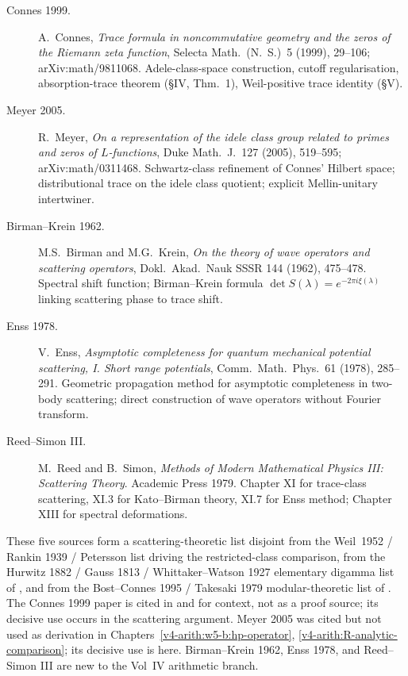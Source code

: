\begin{description}
\item[Connes 1999.] A.~Connes, \emph{Trace formula in noncommutative
geometry and the zeros of the Riemann zeta function}, Selecta
Math.~(N.~S.)~5 (1999), 29--106; arXiv:math/9811068. Adele-class-space
construction, cutoff regularisation, absorption-trace theorem
(\S IV, Thm.~1), Weil-positive trace identity (\S V).
\item[Meyer 2005.] R.~Meyer, \emph{On a representation of the idele
class group related to primes and zeros of \(L\)-functions}, Duke
Math.~J.~127 (2005), 519--595; arXiv:math/0311468. Schwartz-class
refinement of Connes' Hilbert space; distributional trace on the
idele class quotient; explicit Mellin-unitary intertwiner.
\item[Birman--Krein 1962.] M.S.~Birman and M.G.~Krein, \emph{On the
theory of wave operators and scattering operators}, Dokl.~Akad.~Nauk
SSSR 144 (1962), 475--478. Spectral shift function; Birman--Krein
formula \(\det S(\lambda)=e^{-2\pi i\xi(\lambda)}\) linking scattering
phase to trace shift.
\item[Enss 1978.] V.~Enss, \emph{Asymptotic completeness for quantum
mechanical potential scattering, I. Short range potentials},
Comm.~Math.~Phys.~61 (1978), 285--291. Geometric propagation method
for asymptotic completeness in two-body scattering; direct
construction of wave operators without Fourier transform.
\item[Reed--Simon III.] M.~Reed and B.~Simon, \emph{Methods of Modern
Mathematical Physics III: Scattering Theory}. Academic Press 1979.
Chapter XI for trace-class scattering, XI.3 for Kato--Birman theory,
XI.7 for Enss method; Chapter XIII for spectral deformations.
\end{description}

These five sources form a scattering-theoretic list disjoint from
the Weil~1952 / Rankin 1939 / Petersson list driving the restricted-class comparison, from
the Hurwitz 1882 / Gauss 1813 / Whittaker--Watson 1927 elementary
digamma list of , and from
the Bost--Connes 1995 / Takesaki 1979 modular-theoretic list of
. The Connes 1999 paper is cited in
 and  for
context, not as a proof source; its decisive use occurs in
the scattering argument. Meyer 2005 was cited but not used as derivation in
Chapters~\ref{v4-arith:w5-b:hp-operator},
\ref{v4-arith:R-analytic-comparison}; its decisive use is here.
Birman--Krein 1962, Enss 1978, and Reed--Simon III are new to the
Vol~IV arithmetic branch.

